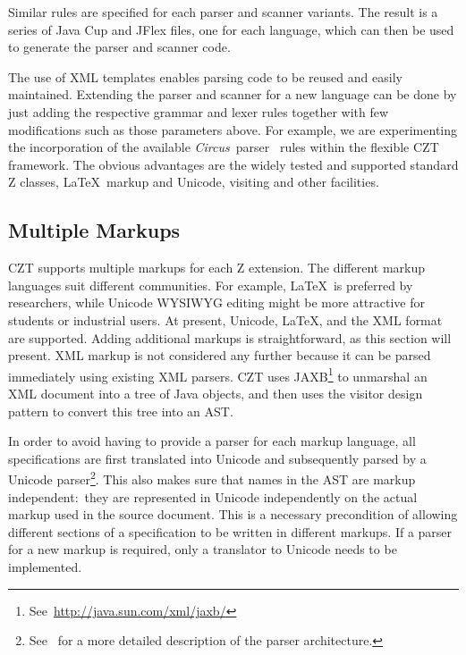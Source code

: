 \documentclass{llncs}
\newcommand{\Circus}{{\sf\slshape Circus}}
\begin{document}
Similar rules are specified for each parser and scanner variants. The
result is a series of Java Cup and JFlex files, one for each language,
which can then be used to generate the parser and scanner code.

The use of XML templates enables parsing code to be reused and easily
maintained.  Extending the parser and scanner for a new language can
be done by just adding the respective grammar and lexer rules together
with few modifications such as those parameters above.  For example,
we are experimenting the incorporation of the available \Circus\
parser~\cite{circus.other:parser} rules within the flexible CZT
framework. The obvious advantages are the widely tested and supported
standard Z classes, \LaTeX\ markup and Unicode, visiting and other
facilities.

\subsection{Multiple Markups}\label{multiple-markups}

 CZT supports multiple markups for each Z extension.  The different
 markup languages suit different communities.  For example, \LaTeX\ is
 preferred by researchers, while Unicode WYSIWYG editing might be more
 attractive for students or industrial users. At present, Unicode,
 \LaTeX, and the XML format are supported.  Adding additional markups
 is straightforward, as this section will present.  XML markup is not
 considered any further because it can be parsed immediately using
 existing XML parsers.  CZT uses
 JAXB\footnote{See~\url{http://java.sun.com/xml/jaxb/}} to unmarshal an
 XML document into a tree of Java objects, and then uses the visitor
 design pattern to convert this tree into an AST.

In order to avoid having to provide a parser for each markup language,
all specifications are first translated into Unicode and subsequently
parsed by a Unicode parser\footnote{See~\cite{czt} for a more detailed
description of the parser architecture.}.  This also makes sure that
names in the AST are markup independent:~they are represented in
Unicode independently on the actual markup used in the source
document.  This is a necessary precondition of allowing different
sections of a specification to be written in different markups.  If a
parser for a new markup is required, only a translator to Unicode
needs to be implemented.
\end{document}
